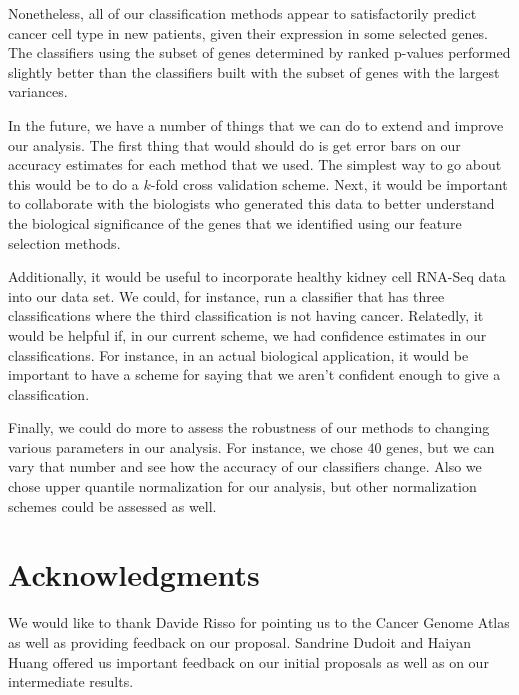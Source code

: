 Nonetheless, all of our classification methods appear to satisfactorily predict
cancer cell type in new patients, given their expression in some selected
genes. The classifiers using the subset of genes determined by ranked p-values
performed slightly better than the classifiers built with the subset of genes
with the largest variances.

In the future, we have a number of things that we can do to extend and improve
our analysis. The first thing that would should do is get error bars on our
accuracy estimates for each method that we used. The simplest way to go about
this would be to do a $k$-fold cross validation scheme. Next, it would be
important to collaborate with the biologists who generated this data to better
understand the biological significance of the genes that we identified using
our feature selection methods. 

Additionally, it would be useful to incorporate healthy kidney cell RNA-Seq
data into our data set. We could, for instance, run a classifier that has three
classifications where the third classification is not having cancer. Relatedly,
it would be helpful if, in our current scheme, we had confidence estimates in
our classifications. For instance, in an actual biological application, it
would be important to have a scheme for saying that we aren't confident enough
to give a classification. 

Finally, we could do more to assess the robustness of our methods to changing
various parameters in our analysis. For instance, we chose $40$ genes, but we
can vary that number and see how the accuracy of our classifiers change. Also
we chose upper quantile normalization for our analysis, but other normalization
schemes could be assessed as well. 



\section*{Acknowledgments}

We would like to thank Davide Risso for pointing us to the Cancer Genome Atlas
as well as providing feedback on our proposal. Sandrine Dudoit and Haiyan Huang
offered us important feedback on our initial proposals as well as on our
intermediate results. 




